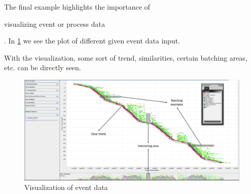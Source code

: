 \begin{note}The final example highlights the importance of \end{note}visualizing event or process data\begin{note}. In \ref{fig:2_event_data} we see the plot of different given event data input.\end{note} With the visualization, some sort of trend, similarities, certain batching areas, etc. can be directly seen.

\begin{figure}[H]
  \centering
  \includegraphics[width=\textwidth]{assets/visualization_and_extraction/event_data_visualization.png}
  \caption{Visualization of event data}
  \label{fig:2_event_data}
\end{figure}









